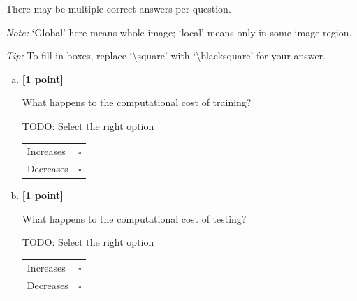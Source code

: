 There may be multiple correct answers per question.

\emph{Note:} `Global' here means whole image; `local' means only in some image region.

\emph{Tip:} To fill in boxes, replace `\textbackslash square' with `\textbackslash blacksquare' for your answer.



\begin{enumerate}[(a)]
    \item \textbf{[1 point]}
    \begin{tcolorbox}[colback=orange!5!white,colframe=orange!75!black]
    What happens to the computational cost of training?
    \end{tcolorbox}
    \begin{tcolorbox}[colback=white!5!white,colframe=green!75!black]
    TODO: Select the right option %
    
\begin{tabular}[h]{lr}
\toprule
Increases & $\square$ \\
Decreases & $\square$ \\
\bottomrule
\end{tabular}
\end{tcolorbox}
    
    \item \textbf{[1 point]}
    \begin{tcolorbox}[colback=orange!5!white,colframe=orange!75!black]
    What happens to the computational cost of testing?
    \end{tcolorbox}
    \begin{tcolorbox}[colback=white!5!white,colframe=green!75!black]
    TODO: Select the right option %
    
\begin{tabular}[h]{lr}
\toprule
Increases & $\square$ \\
Decreases & $\square$ \\
\bottomrule
\end{tabular}
    \end{tcolorbox}


\end{enumerate}
